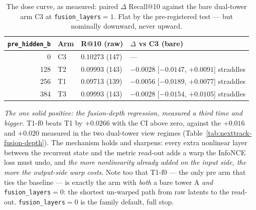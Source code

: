 \documentclass[11pt]{article}
\begin{document}
\begin{table}[ht]
  \centering
  \caption{The dose curve, as measured: paired $\Delta$ Recall@10 against the
  bare dual-tower arm C3 at \texttt{fusion\_layers}${}=1$. Flat by the
  pre-registered test --- but nominally downward, never upward.}
  \label{tab:nexttrack-preencoder-dose}
  {\footnotesize\setlength{\tabcolsep}{6pt}\begin{tabular}{rlll}
    \toprule
    \texttt{pre\_hidden\_b} & Arm & R@10 (raw) & $\Delta$ vs C3 (bare) \\
    \midrule
    0 & C3 & 0.10273 (147) & --- \\
    128 & T2 & 0.09993 (143) & $-0.0028$ [$-0.0147$, $+0.0091$] straddles \\
    256 & T1 & 0.09713 (139) & $-0.0056$ [$-0.0189$, $+0.0077$] straddles \\
    384 & T3 & 0.09993 (143) & $-0.0028$ [$-0.0154$, $+0.0105$] straddles \\
    \bottomrule
  \end{tabular}}
\end{table}

\emph{The one solid positive: the fusion-depth regression, measured a third
time and bigger.} T1-f0 beats T1 by $+\num{0.0266}$ with the CI above zero,
against the $+\num{0.016}$ and $+\num{0.020}$ measured in the two dual-tower view
regimes (Table~\ref{tab:nexttrack-fusion-depth}). The mechanism holds and sharpens: every
extra nonlinear layer between the recurrent state and the metric read-out adds a
warp the InfoNCE loss must undo, and \emph{the more nonlinearity already added on
the input side, the more the output-side warp costs}. Note too that T1-f0 --- the
only pre arm that ties the baseline --- is exactly the arm with \emph{both} a bare
tower A \emph{and} \texttt{fusion\_layers}${}=0$: the shortest un-warped path from
raw latents to the read-out. \texttt{fusion\_layers}${}=0$ is the family default,
full stop.
\end{document}
